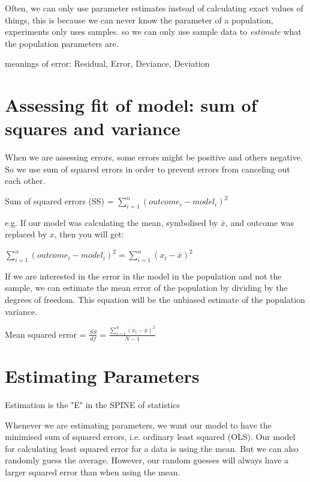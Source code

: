 Often, we can only use parameter estimates instead of calculating exact values of things, this is because we can never know the parameter of a population, experiments only uses samples. so we can only use sample data to \emph{estimate} what the population parameters are.

meanings of error: Residual, Error, Deviance, Deviation

\section{Assessing fit of model: sum of squares and variance}
When we are assessing errors, some errors might be positive and others negative. So we use sum of squared errors in order to prevent errors from canceling out each other.

\begin{center}
Sum of squared errors (SS) = $ \sum_{i=1}^{n} (outcome_i - model_i)^2 $
\end{center}

e.g. If our model was calculating the mean, symbolised by $\bar{x}$, and outcome was replaced by $x$, then you will get:
\begin{center}
$ \sum_{i=1}^{n}  (outcome_i - model_i)^2 = \sum_{i=1}^{n}(x_i - \bar{x})^2 $
\end{center}

If we are interested in the error in the model in the population and not the sample, we can estimate the mean error of the population by dividing by the degrees of freedom. This equation will be the unbiased estimate of the population variance.

\begin{center}
Mean squared error = \Large $ \frac{SS}{df} = \frac{\sum_{i=1}^{n}(x_i - \bar{x})^2 }{N-1}$
\end{center}

\section{Estimating Parameters}
Estimation is the "E" in the SPINE of statistics

Whenever we are estimating parameters, we want our model to have the minimised sum of squared errors, i.e. ordinary least squared (OLS). Our model for calculating least squared error for a data is using the mean. But we can also randomly guess the average. However, our random guesses will always have a larger squared error than when using the mean. 

